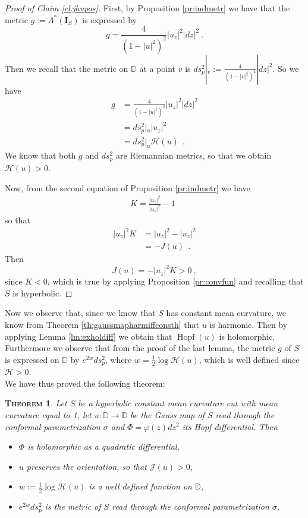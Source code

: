 \documentclass[a4paper,11pt,openright,twoside]{book}
\newcommand{\I}{\mathbf{I}}
\newcommand{\Hopf}{\operatorname{Hopf}}
\newcommand{\1}{\mathds{1}}
\theoremstyle{plain}
\newtheorem{thm}{\textsc{Theorem}}[chapter]
\theoremstyle{definition}
\theoremstyle{remark}
\begin{document}
\begin{proof}[Proof of Claim \ref{cl:jhupos}]
	First, by Proposition \ref{pr:indmetr} we have that the metric $g:= \Lambda^*(\I_S)$ is expressed by
	\[g =  \frac{4}{(1-|u|^2)^2}|u_z|^2 |dz|^2\ .\] 
	Then we recall that the metric on $\mathbb{D}$ at a point $v$ is $ds_p^2|_v:= \frac{4}{(1-|v|^2)^2} |dz|^2$.
	So we have
	\begin{align*}
		g &=  \frac{4}{(1-|u|^2)^2} |u_z|^2|dz|^2 \\
		&=  ds_p^2|_u|u_z|^2  \\
		&= ds_p^2|_u \mathcal H(u) 
	\ \ . 
	\end{align*}
	We know that both  $g$ and $ds_p^2$ are Riemannian metrics, so that we obtain $\mathcal H(u)>0$.

	Now, from the second equation of Proposition \ref{pr:indmetr} we have
	\begin{align*}
		K = \frac{|u_{\overline{z}}|^2}{|u_z|^2}-1
	\ \  
	\end{align*}
	so that	
	 \begin{align*}
		 |u_z|^2 K &= |u_{\overline{z}}|^2-|u_z|^2\\
		 &=  -J(u) 
	\ \ . 
	\end{align*}
	Then \[J(u)=-|u_z|^2K>0\ ,\] since $K<0$, which is true by applying Proposition \ref{pr:convfun} and recalling that $S$ is hyperbolic.
\end{proof}
Now we observe that, since we know that $S$ has constant mean curvature, we know from Theorem \ref{th:gaussmapharmiffconsth} that $u$ is harmonic. Then by applying Lemma \ref{lm:exholdiff} we obtain that $\Hopf(u)$ is holomorphic. Furthermore we observe that from the proof of the last lemma, the metric $g$ of $S$ is expressed on $\mathbb{D}$ by $e^{2w}ds_p^2$, where $w=\frac{1}{2}\log \mathcal{H}(u)$, which is well defined since $\mathcal{H}>0$.\\

We have thus proved the following theorem:
\begin{thm}\label{th:pdenecthm}
	Let $S$ be a hyperbolic constant mean curvature cut with mean curvature equal to 1, let $u:\mathbb{D}\to \mathbb{D}$ be the Gauss map of $S$ read through the conformal parametrization $\sigma$ and $\Phi = \varphi(z)dz^2$ its Hopf differential. Then
	\begin{itemize}[itemsep=0mm]
		\item $\Phi$ is holomorphic as a quadratic differential,
		\item $u$ preserves the orientation, so that $\mathcal{J}(u)>0$,
		\item $w := \frac{1}{2}\log\mathcal{H}(u)$ is a well defined function on $\mathbb{D}$,
		\item $e^{2w}ds_p^2$ is  the metric of $S$ read through the conformal parametrization $\sigma$,
	\end{itemize}

\end{thm}
\end{document}
